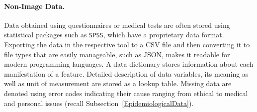 \documentclass[journal]{style/vgtc} 			          %
\begin{document}
\paragraph{Non-Image Data. }
%
%
Data obtained using questionnaires or medical tests are often stored using statistical packages such as \texttt{SPSS}, which have a proprietary data format. %
%
Exporting the data in the respective tool to a CSV file and then converting it to file types that are easily manageable, such as JSON, makes it readable for modern programming languages.
%
%
A data dictionary stores information about each manifestation of a feature.
%
Detailed description of data variables, its meaning as well as unit of measurement are stored as a lookup table.
%
%
Missing data are denoted using error codes indicating their cause ranging from ethical to medical and personal issues (recall Subsection~\ref{EpidemiologicalData}).
%
\end{document}
